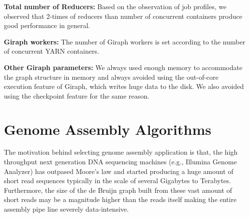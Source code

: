 \documentclass[journal]{IEEEtran}
\begin{document}
\textbf{Total number of Reducers:} Based on the observation of job profiles, we observed that 2-times of reducers than number of concurrent containers produce good performance in general. 

\textbf{Giraph workers:} The number of Giraph workers is set according to the number of concurrent YARN containers.

\textbf{Other Giraph parameters:} We always used enough memory to accommodate the graph structure in memory and always avoided using the out-of-core execution feature of Giraph, which writes huge data to the disk. We also avoided using the checkpoint feature for the same reason.


\section{Genome Assembly Algorithms}
\label{app:GenomeAssemblyAlgorithms}
The motivation behind selecting genome assembly application is that, the high throughput next generation DNA sequencing machines (e.g., Illumina Genome Analyzer) has outpased Moore's law and started producing a huge amount of short read sequences typically in the scale of several Gigabytes to Terabytes. Furthermore, the size of the de Bruijn graph built from these vast amount of short reads may be a magnitude higher than the reads itself making the entire assembly pipe line severely data-intensive.
\end{document}
